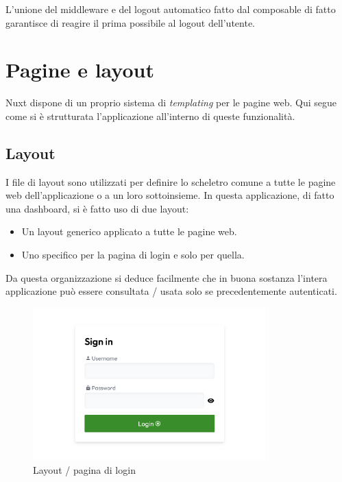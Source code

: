 L'unione del middleware e del logout automatico fatto dal composable di fatto garantisce di reagire il prima possibile al logout dell'utente.

\section{Pagine e layout}
Nuxt dispone di un proprio sistema di \emph{templating} per le pagine web. Qui segue come si è strutturata l'applicazione all'interno di queste funzionalità.

\subsection{Layout}
I file di layout sono utilizzati per definire lo scheletro comune a tutte le pagine web dell'applicazione o a un loro sottoinsieme. In questa applicazione, di fatto una dashboard, si è fatto uso di due layout:
\begin{itemize}
    \item Un layout generico applicato a tutte le pagine web.
    \item Uno specifico per la pagina di login e solo per quella.
\end{itemize}
Da questa organizzazione si deduce facilmente che in buona sostanza l'intera applicazione può essere consultata / usata solo se precedentemente autenticati.

\begin{figure}
\centering
\includegraphics[width=0.8\textwidth]{img/login.png}
\caption{Layout / pagina di login}
\end{figure}

